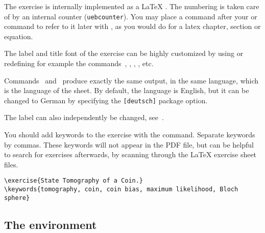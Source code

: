 \documentclass[11pt,a4paper]{article}
\begin{document}
The exercise is internally implemented as a \LaTeX{} . The numbering is
taken care of by an internal counter (\texttt{uebcounter}). You may place a
 command after your  or  command to
refer to it later with , as you would do for a latex chapter, section or
equation.

The label and title font of the exercise can be highly customized by using or redefining
for example the commands~, ,
, , etc.


\begin{pkgnotice}
  Commands~ and~ produce exactly the same output, in
  the same language, which is the language of the sheet. By default, the language is
  English, but it can be changed to German by specifying the \texttt{[deutsch]} package
  option.

  The label can also independently be changed, see~.
\end{pkgnotice}

You should add keywords to the exercise with the  command. Separate
keywords by commas. These keywords will not appear in the PDF file, but can be helpful to
search for exercises afterwards, by scanning through the \LaTeX{} exercise sheet files.
\begin{pkgverbatim}
\begin{verbatim}
\exercise{State Tomography of a Coin.}
\keywords{tomography, coin, coin bias, maximum likelihood, Bloch sphere}
\end{verbatim}
\end{pkgverbatim}





\subsection{The  environment}
\end{document}
